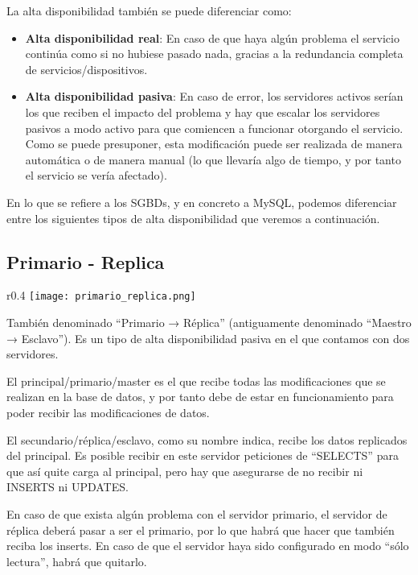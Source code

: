 La alta disponibilidad también se puede diferenciar como:


\begin{itemize}
    \item \textbf{Alta disponibilidad real}: En caso de que haya algún problema el servicio continúa como si no hubiese pasado nada, gracias a la redundancia completa de servicios/dispositivos.
    \item \textbf{Alta disponibilidad pasiva}: En caso de error, los servidores activos serían los que reciben el impacto del problema y hay que escalar los servidores pasivos a modo activo para que comiencen a funcionar otorgando el servicio. Como se puede presuponer, esta modificación puede ser realizada de manera automática o de manera manual (lo que llevaría algo de tiempo, y por tanto el servicio se vería afectado).
\end{itemize}


En lo que se refiere a los SGBDs, y en concreto a MySQL, podemos diferenciar entre los siguientes tipos de alta disponibilidad que veremos a continuación.


\subsection{Primario - Replica}
\begin{wrapfigure}{r}{0.4\linewidth}
    \centering
    \vspace{-50pt}
    \texttt{[image: primario\_replica.png]}
    \vspace{-30pt}
\end{wrapfigure}
También denominado “Primario → Réplica” (antiguamente denominado “Maestro → Esclavo”). Es un tipo de alta disponibilidad pasiva en el que contamos con dos servidores.

El principal/primario/master es el que recibe todas las modificaciones que se realizan en la base de datos, y por tanto debe de estar en funcionamiento para poder recibir las modificaciones de datos.

El secundario/réplica/esclavo, como su nombre indica, recibe los datos replicados del principal. Es posible recibir en este servidor peticiones de “SELECTS” para que así quite carga al principal, pero hay que asegurarse de no recibir ni INSERTS ni UPDATES.

En caso de que exista algún problema con el servidor primario, el servidor de réplica deberá pasar a ser el primario, por lo que habrá que hacer que también reciba los inserts. En caso de que el servidor haya sido configurado en modo “sólo lectura”, habrá que quitarlo.

